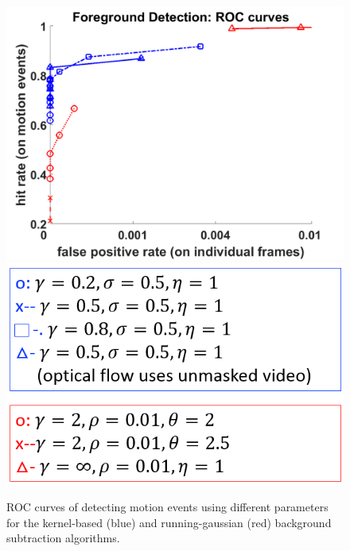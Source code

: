 \documentclass[12pt,oneside]{article} %
\begin{document}
\begin{figure}[htb]
\includegraphics[scale=0.4]{images/roc.png}
\includegraphics[scale=0.4]{images/legend.png}
\caption{ROC curves of detecting motion events using different parameters for the kernel-based (blue)
and running-gaussian (red) background subtraction algorithms.}
\label{roc}
\end{figure}
\end{document}
